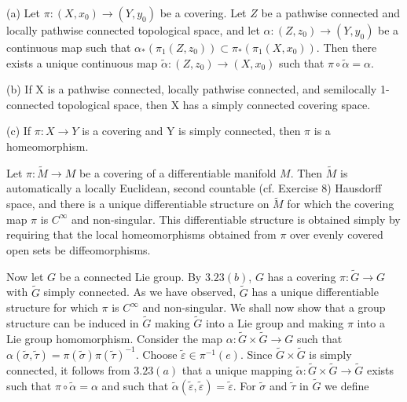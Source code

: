 \begin{theorem}\label{thm:3.23}
(a) Let $\pi: (X, x_0) \to (Y, y_0)$ be a covering. Let $Z$ be a pathwise connected and locally pathwise connected topological space, and let $\alpha: (Z, z_0) \to (Y, y_0)$ be a continuous map such that $\alpha_*(\pi_1(Z, z_0)) \subset \pi_*(\pi_1(X, x_0))$. Then there exists a unique continuous map $\tilde{\alpha}: (Z, z_0) \to (X, x_0)$ such that $\pi \circ \tilde{\alpha} = \alpha$.

\begin{center}
\end{center}

(b) If X is a pathwise connected, locally pathwise connected, and semilocally 1-connected topological space, then X has a simply connected covering space.

(c) If  $ \pi: X \to Y $ is a covering and Y is simply connected, then  $ \pi $ is a homeomorphism.

\end{theorem}
\label{thm:3.24}
Let $\pi: \widetilde{M} \to M$ be a covering of a differentiable manifold $M$. Then $\widetilde{M}$ is automatically a locally Euclidean, second countable (cf. Exercise 8) Hausdorff space, and there is a unique differentiable structure on $\widetilde{M}$ for which the covering map $\pi$ is $C^\infty$ and non-singular. This differentiable structure is obtained simply by requiring that the local homeomorphisms obtained from $\pi$ over evenly covered open sets be diffeomorphisms.

Now let $G$ be a connected Lie group. By $3.23(b)$, $G$ has a covering $\pi: \tilde{G} \to G$ with $\tilde{G}$ simply connected. As we have observed, $\tilde{G}$ has a unique differentiable structure for which $\pi$ is $C^\infty$ and non-singular. We shall now show that a group structure can be induced in $\tilde{G}$ making $\tilde{G}$ into a Lie group and making $\pi$ into a Lie group homomorphism. Consider the map $\alpha: \tilde{G} \times \tilde{G} \to G$ such that $\alpha(\tilde{\sigma}, \tilde{\tau}) = \pi(\tilde{\sigma}) \pi(\tilde{\tau})^{-1}$. Choose $\tilde{\varepsilon} \in \pi^{-1}(e)$. Since $\tilde{G} \times \tilde{G}$ is simply connected, it follows from $3.23(a)$ that a unique mapping $\tilde{\alpha}: \tilde{G} \times \tilde{G} \to \tilde{G}$ exists such that $\pi \circ \tilde{\alpha} = \alpha$ and such that $\tilde{\alpha}(\tilde{\varepsilon}, \tilde{\varepsilon}) = \tilde{\varepsilon}$. For $\tilde{\sigma}$ and $\tilde{\tau}$ in $\tilde{G}$ we define

